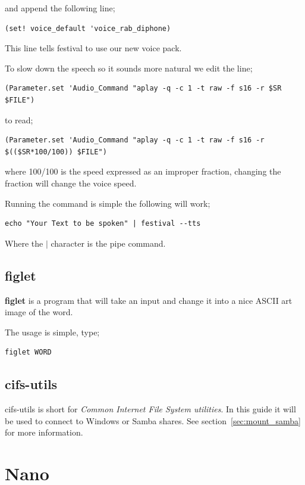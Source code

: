 and append the following line;

\begin{verbatim}
(set! voice_default 'voice_rab_diphone)
\end{verbatim}

This line tells festival to use our new voice pack.

To slow down the speech so it sounds more natural we edit the line;

\begin{verbatim}
(Parameter.set 'Audio_Command "aplay -q -c 1 -t raw -f s16 -r $SR $FILE")
\end{verbatim}

to read;

\begin{verbatim}
(Parameter.set 'Audio_Command "aplay -q -c 1 -t raw -f s16 -r $(($SR*100/100)) $FILE")
\end{verbatim}

where 100/100 is the speed expressed as an improper fraction, changing the fraction will change the voice speed.

Running the command is simple the following will work;

\begin{lstlisting}
echo "Your Text to be spoken" | festival --tts
\end{lstlisting}

Where the $|$ character is the pipe command.

\subsection{figlet}

\textbf{figlet} is a program that will take an input and change it into a nice ASCII art image of the word.

The usage is simple, type;

\begin{lstlisting}
figlet WORD
\end{lstlisting}

\subsection{cifs-utils}

cifs-utils is short for \textit{Common Internet File System utilities}.  In this guide it will be used to connect to Windows or Samba shares. See section~\ref{sec:mount_samba} for more information.

\section{Nano}
\label{sec:nano}

